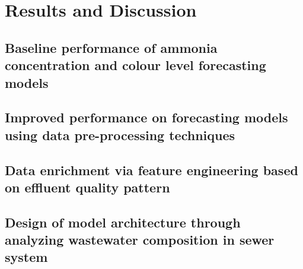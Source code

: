 \chapter{Results and Discussion}
\section{Baseline performance of ammonia concentration and colour level forecasting models}
\section{Improved performance on forecasting models using data pre-processing techniques}
\section{Data enrichment via feature engineering based on effluent quality pattern}
\section{Design of model architecture through analyzing wastewater composition in sewer system}
